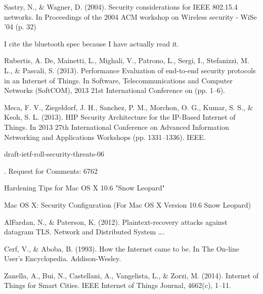 \documentclass[10pt,journal,compsoc]{IEEEtran}
\begin{document}
\begin{thebibliography}{1}
Sastry, N., \& Wagner, D. (2004). Security considerations for IEEE 802.15.4 networks. In Proceedings of the 2004 ACM workshop on Wireless security - WiSe ’04 (p. 32)

I cite the bluetooth spec because I have actually read it.
 
Rubertis, A. De, Mainetti, L., Mighali, V., Patrono, L., Sergi, I., Stefanizzi, M. L., \& Pascali, S. (2013). Performance Evaluation of end-to-end security protocols in an Internet of Things. In Software, Telecommunications and Computer Networks (SoftCOM), 2013 21st International Conference on (pp. 1–6). 

Meca, F. V., Ziegeldorf, J. H., Sanchez, P. M., Morchon, O. G., Kumar, S. S., \& Keoh, S. L. (2013). HIP Security Architecture for the IP-Based Internet of Things. In 2013 27th International Conference on Advanced Information Networking and Applications Workshops (pp. 1331–1336). IEEE. 

draft-ietf-roll-security-threats-06

.
Request for Comments: 6762

Hardening Tips for Mac OS X 10.6 "Snow Leopard"

Mac OS X: Security Configuration (For Mac OS X Version 10.6 Snow Leopard)

AlFardan, N., \& Paterson, K. (2012). Plaintext-recovery attacks against datagram TLS. Network and Distributed System …. 

Cerf, V., \& Aboba, B. (1993). How the Internet came to be. In The On-line User’s Encyclopedia. Addison-Wesley. 

Zanella, A., Bui, N., Castellani, A., Vangelista, L., \& Zorzi, M. (2014). Internet of Things for Smart Cities. IEEE Internet of Things Journal, 4662(c), 1–11. 

\end{thebibliography}



\end{document}
